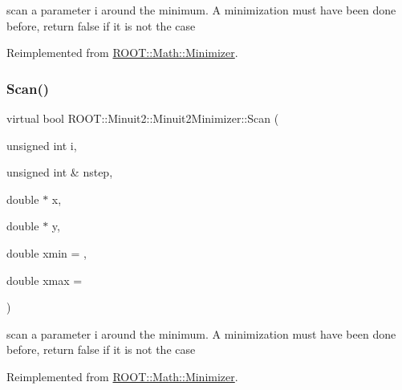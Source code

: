 scan a parameter i around the minimum. A minimization must have been done before, return false if it is not the case 

Reimplemented from \mbox{\hyperlink{classROOT_1_1Math_1_1Minimizer_a1e6e4b32d7338a7a08791cff67f54080}{R\+O\+O\+T\+::\+Math\+::\+Minimizer}}.

\mbox{\label{classROOT_1_1Minuit2_1_1Minuit2Minimizer_a3f2f94c743a9b120a71da5ba23bd88cb}} 
\subsubsection{\texorpdfstring{Scan()}{Scan()}\hspace{0.1cm}{\footnotesize\ttfamily [2/3]}}
{\footnotesize\ttfamily virtual bool R\+O\+O\+T\+::\+Minuit2\+::\+Minuit2\+Minimizer\+::\+Scan (\begin{DoxyParamCaption}\item[{unsigned int}]{i,  }\item[{unsigned int \&}]{nstep,  }\item[{double $\ast$}]{x,  }\item[{double $\ast$}]{y,  }\item[{double}]{xmin = {},  }\item[{double}]{xmax = {} }\end{DoxyParamCaption})\hspace{0.3cm}{\ttfamily [virtual]}}

scan a parameter i around the minimum. A minimization must have been done before, return false if it is not the case 

Reimplemented from \mbox{\hyperlink{classROOT_1_1Math_1_1Minimizer_a1e6e4b32d7338a7a08791cff67f54080}{R\+O\+O\+T\+::\+Math\+::\+Minimizer}}.

\mbox{\label{classROOT_1_1Minuit2_1_1Minuit2Minimizer_a3f2f94c743a9b120a71da5ba23bd88cb}} 
